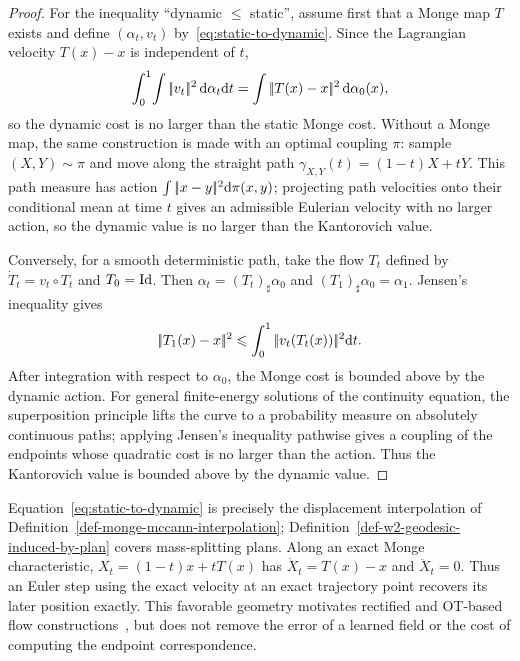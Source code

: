 \begin{proof}
	For the inequality ``dynamic $\leq$ static'', assume first that a Monge map $T$ exists and define $(\alpha_t,v_t)$ by~\eqref{eq:static-to-dynamic}. Since the Lagrangian velocity $T(x)-x$ is independent of $t$,
	\[
		\int_0^1\!\int|\!| v_t |\!|^2\,\mathrm{d}\alpha_t\mathrm{d} t
		=
		\int|\!| T(x)-x |\!|^2\,\mathrm{d}\alpha_0(x),
	\]
	so the dynamic cost is no larger than the static Monge cost. Without a Monge map, the same construction is made with an optimal coupling $\pi$: sample $(X,Y)\sim\pi$ and move along the straight path $\gamma_{X,Y}(t)=(1-t)X+tY$. This path measure has action $\int|\!| x-y |\!|^2\mathrm{d}\pi(x,y)$; projecting path velocities onto their conditional mean at time $t$ gives an admissible Eulerian velocity with no larger action, so the dynamic value is no larger than the Kantorovich value.

	Conversely, for a smooth deterministic path, take the flow $T_t$ defined by $\dot T_t=v_t\circ T_t$ and $T_0=\mathrm{Id}$. Then $\alpha_t=(T_t)_\sharp\alpha_0$ and $(T_1)_\sharp\alpha_0=\alpha_1$. Jensen's inequality gives
	\[
		|\!| T_1(x)-x |\!|^2
		\leqslant
		\int_0^1|\!| v_t(T_t(x)) |\!|^2\mathrm{d} t.
	\]
	After integration with respect to $\alpha_0$, the Monge cost is bounded above by the dynamic action. For general finite-energy solutions of the continuity equation, the superposition principle lifts the curve to a probability measure on absolutely continuous paths; applying Jensen's inequality pathwise gives a coupling of the endpoints whose quadratic cost is no larger than the action. Thus the Kantorovich value is bounded above by the dynamic value.
\end{proof}

Equation~\eqref{eq:static-to-dynamic} is precisely the displacement interpolation of Definition~\ref{def-monge-mccann-interpolation}; Definition~\ref{def-w2-geodesic-induced-by-plan} covers mass-splitting plans. Along an exact Monge characteristic, $X_t=(1-t)x+tT(x)$ has $\dot X_t=T(x)-x$ and $\ddot X_t=0$. Thus an Euler step using the exact velocity at an exact trajectory point recovers its later position exactly. This favorable geometry motivates rectified and OT-based flow constructions~\cite{Liu2023RectifiedFlow,HertrichChambolleDelon2025RectifiedOT}, but does not remove the error of a learned field or the cost of computing the endpoint correspondence.

